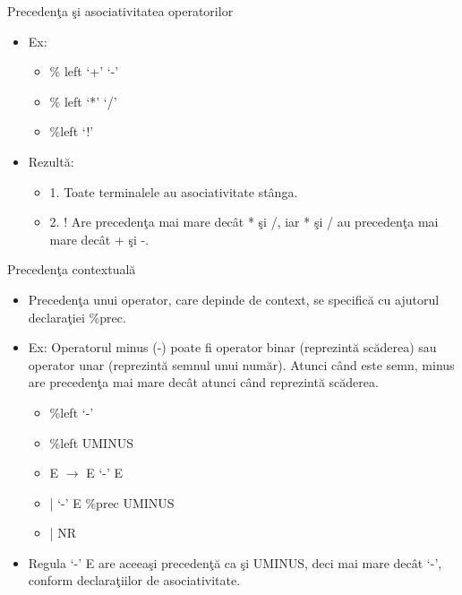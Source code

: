 \documentclass[pdf]{beamer}
\begin{document}
\begin{frame}{Precedenţa şi asociativitatea operatorilor}
\begin{itemize}
	\item
	Ex:

	\begin{itemize}
		\item[]
		\% left ‘+’ ‘-’

		\item[]
		\% left ‘*’ ‘/’

		\item[]
		\%left ‘!’

	\end{itemize}	

	\item
	Rezultă:

	\begin{itemize}
		\item[]
		1. Toate terminalele au asociativitate stânga.

		\item[]
		2. ! Are precedenţa mai mare decât * şi /, iar * şi / au precedenţa mai mare decât + şi -.

	\end{itemize}	

\end{itemize}
\end{frame}



\begin{frame}{Precedenţa contextuală}
\begin{itemize}
	\item
	Precedenţa unui operator, care depinde de context, se specifică cu ajutorul declaraţiei {\color{red}\%prec}. 

	\item
	Ex: Operatorul minus (-) poate fi operator binar (reprezintă scăderea) sau operator unar (reprezintă semnul unui număr). Atunci când este semn, minus are precedenţa mai mare decât atunci când reprezintă scăderea.

	\begin{itemize}
		\item[]
		\%left ‘-’

		\item[]
		\%left UMINUS

		\item[]
		E  $\rightarrow$  E ‘-’ E

		\item[]
		\hspace{0.7cm} | ‘-’ E {\color{red}\%prec UMINUS}   

		\item[]
		\hspace{0.7cm} | NR

	\end{itemize}

	\item
	Regula ‘-’ E are aceeaşi precedenţă ca şi UMINUS, deci mai mare decât ‘-’, conform declaraţiilor de asociativitate.

\end{itemize}
\end{frame}
\end{document}
